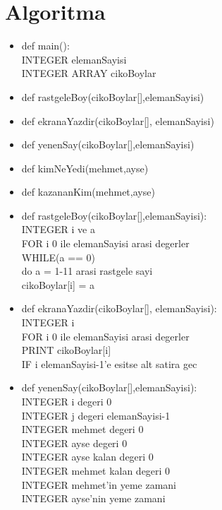 \documentclass{article}
\begin{document}
	\section{Algoritma}
	\begin{itemize}
		\item def main():\\
		INTEGER elemanSayisi \\
		INTEGER ARRAY cikoBoylar
		
		\item def rastgeleBoy(cikoBoylar[],elemanSayisi)
		
		\item def ekranaYazdir(cikoBoylar[], elemanSayisi)
		
		\item def yenenSay(cikoBoylar[],elemanSayisi)
		
		\item def kimNeYedi(mehmet,ayse)
		
		\item def kazananKim(mehmet,ayse)
		
		\item def rastgeleBoy(cikoBoylar[],elemanSayisi):\\
		INTEGER i ve a\\
		FOR i 0 ile elemanSayisi arasi degerler\\
		WHILE(a == 0)\\
		do {a = 1-11 arasi rastgele sayi}\\
		cikoBoylar[i] = a
		
		\item def ekranaYazdir(cikoBoylar[], elemanSayisi):\\
		INTEGER i\\
		FOR i 0 ile elemanSayisi arasi degerler\\
		PRINT cikoBoylar[i]\\
		IF i elemanSayisi-1'e esitse alt satira gec\\
		
		\item def yenenSay(cikoBoylar[],elemanSayisi):\\
		INTEGER i degeri 0\\
		INTEGER j degeri elemanSayisi-1\\
		INTEGER mehmet degeri 0\\
		INTEGER ayse degeri 0\\
		INTEGER ayse kalan degeri 0\\
		INTEGER mehmet kalan degeri 0\\
		INTEGER mehmet'in yeme zamani\\
		INTEGER ayse'nin yeme zamani\\
		

\end{itemize}
\end{document}
